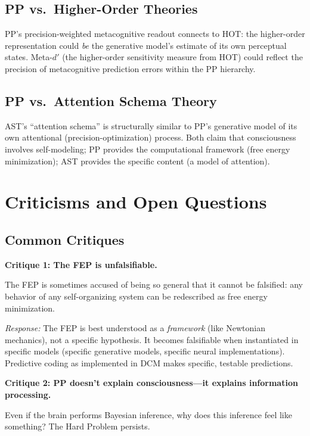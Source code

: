 \documentclass[11pt,a4paper]{report}
\begin{document}
\section{PP vs.\ Higher-Order Theories}

PP's precision-weighted metacognitive readout connects to HOT: the higher-order representation could \emph{be} the generative model's estimate of its own perceptual states. Meta-$d'$ (the higher-order sensitivity measure from HOT) could reflect the precision of metacognitive prediction errors within the PP hierarchy.

\section{PP vs.\ Attention Schema Theory}

AST's ``attention schema'' is structurally similar to PP's generative model of its own attentional (precision-optimization) process. Both claim that consciousness involves self-modeling; PP provides the computational framework (free energy minimization); AST provides the specific content (a model of attention).


\chapter{Criticisms and Open Questions}

\section{Common Critiques}

\textbf{Critique 1: The FEP is unfalsifiable.}

The FEP is sometimes accused of being so general that it cannot be falsified: any behavior of any self-organizing system can be redescribed as free energy minimization.

\emph{Response:} The FEP is best understood as a \emph{framework} (like Newtonian mechanics), not a specific hypothesis. It becomes falsifiable when instantiated in specific models (specific generative models, specific neural implementations). Predictive coding as implemented in DCM makes specific, testable predictions.

\textbf{Critique 2: PP doesn't explain consciousness---it explains information processing.}

Even if the brain performs Bayesian inference, why does this inference feel like something? The Hard Problem persists.
\end{document}
